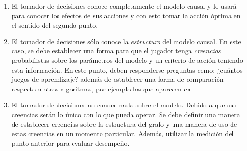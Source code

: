 \documentclass[11pt]{article}
\theoremstyle{plain}
\begin{document}
\begin{enumerate}
\item El tomador de decisiones conoce completamente el modelo causal y lo usará para conocer los efectos de sus acciones y con esto tomar la acción óptima en el sentido del segundo punto.

\item El tomador de decisiones sólo conoce la \textit{estructura} del modelo causal. En este caso, se debe establecer una forma para que el jugador tenga \textit{creencias} probabilistas sobre los parámetros del modelo y un criterio de acción teniendo esta información. En este punto, deben responderse preguntas como: ¿cuántos juegos de aprendizaje? además de establecer una forma de comparación respecto a otros algoritmos, por ejemplo los que aparecen en \cite{lattimoreNIPS2016}.

\item El tomador de decisiones no conoce nada sobre el modelo. Debido a que sus creencias serán lo único con lo que pueda operar. Se debe definir una manera de establecer creencias sobre la estructura del grafo y una manera de uso de estas creencias en un momento particular. Además, utilizar la medición del punto anterior para evaluar desempeño.
\end{enumerate}
\end{document}
